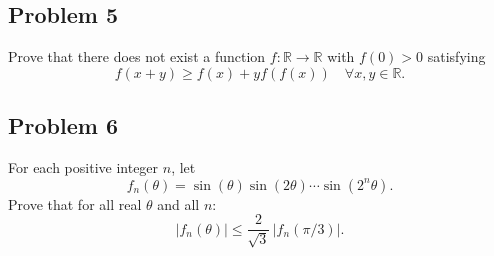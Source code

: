 \documentclass{article}
\begin{document}
\subsection*{Problem 5}
Prove that there does not exist a function $f : \mathbb{R} \to \mathbb{R}$ with $f(0) > 0$ satisfying
\[
f(x+y) \geq f(x) + y f(f(x)) \quad \forall x,y \in \mathbb{R}.
\]

\subsection*{Problem 6}
For each positive integer $n$, let
\[
f_n(\theta) = \sin(\theta) \sin(2\theta) \cdots \sin(2^n \theta).
\]
Prove that for all real $\theta$ and all $n$:
\[
|f_n(\theta)| \leq \frac{2}{\sqrt{3}} \, |f_n(\pi/3)|.
\]
\end{document}
